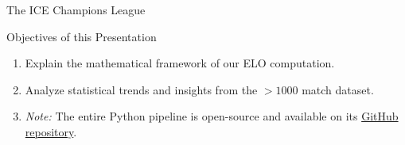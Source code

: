 \documentclass[10pt, aspectratio=169]{beamer}
\begin{document}
\begin{frame}{The ICE Champions League}
    \begin{block}{Objectives of this Presentation}
        \begin{enumerate}
            \item Explain the mathematical framework of our ELO computation.
            \item Analyze statistical trends and insights from the $>1000$ match dataset.
            \item \textit{Note:} The entire Python pipeline is open-source and available on its \href{https://www.github.com/pgrebolt/ICEChampionsLeague}{GitHub repository}.
        \end{enumerate}
    \end{block}

\end{frame}
\end{document}
